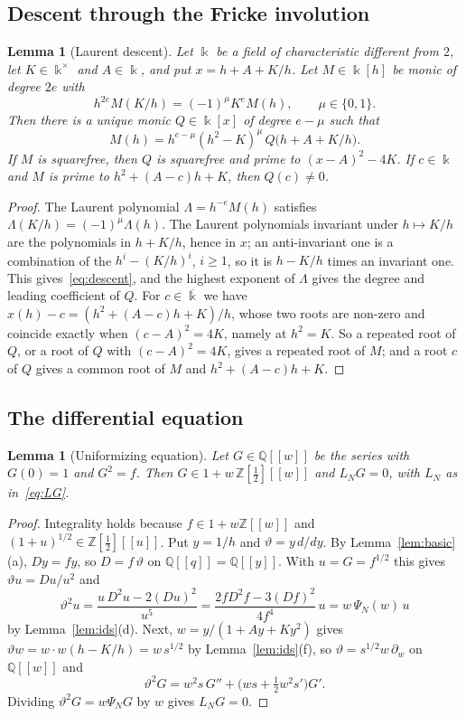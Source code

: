 \documentclass[11pt,a4paper]{article}
\newtheorem{lemma}[theorem]{Lemma}
\theoremstyle{definition}
\theoremstyle{remark}
\newcommand{\Z}{\mathbb{Z}}
\newcommand{\Q}{\mathbb{Q}}
\newcommand{\dw}{\partial_w}
\numberwithin{equation}{section}
\begin{document}
\subsection{Descent through the Fricke involution}

\begin{lemma}[Laurent descent]\label{lem:laurent}
Let $\Bbbk$ be a field of characteristic different from $2$, let
$K\in\Bbbk^\times$ and $A\in\Bbbk$, and put $x=h+A+K/h$. Let $M\in\Bbbk[h]$ be
monic of degree $2e$ with
\[
h^{2e}M(K/h)=(-1)^\mu K^eM(h),\qquad\mu\in\{0,1\}.
\]
Then there is a unique monic $Q\in\Bbbk[x]$ of degree $e-\mu$ such that
\begin{equation}\label{eq:descent}
 M(h)=h^{e-\mu}(h^2-K)^\mu\,Q\bigl(h+A+K/h\bigr).
\end{equation}
If $M$ is squarefree, then $Q$ is squarefree and prime to $(x-A)^2-4K$. If
$c\in\Bbbk$ and $M$ is prime to $h^2+(A-c)h+K$, then $Q(c)\ne0$.
\end{lemma}
\begin{proof}
The Laurent polynomial $\Lambda=h^{-e}M(h)$ satisfies
$\Lambda(K/h)=(-1)^\mu\Lambda(h)$. The Laurent polynomials invariant under
$h\mapsto K/h$ are the polynomials in $h+K/h$, hence in $x$; an anti-invariant
one is a combination of the $h^i-(K/h)^i$, $i\ge1$, so it is $h-K/h$ times an
invariant one. This gives~\eqref{eq:descent}, and the highest exponent of
$\Lambda$ gives the degree and leading coefficient of $Q$. For
$c\in\overline{\Bbbk}$ we have $x(h)-c=(h^2+(A-c)h+K)/h$, whose two roots
are non-zero and coincide exactly when $(c-A)^2=4K$, namely at $h^2=K$. So a
repeated root of $Q$, or a root of $Q$ with $(c-A)^2=4K$, gives a repeated
root of $M$; and a root $c$ of $Q$ gives a common root of $M$ and
$h^2+(A-c)h+K$.
\end{proof}

\subsection{The differential equation}

\begin{lemma}[Uniformizing equation]\label{lem:unif}
Let $G\in\Q[[w]]$ be the series with $G(0)=1$ and $G^2=f$. Then
$G\in1+w\,\Z[\tfrac12][[w]]$ and $L_NG=0$, with $L_N$ as in~\eqref{eq:LG}.
\end{lemma}
\begin{proof}
Integrality holds because $f\in1+w\Z[[w]]$ and
$(1+u)^{1/2}\in\Z[\frac12][[u]]$. Put $y=1/h$ and $\vartheta=y\,d/dy$. By
Lemma~\ref{lem:basic}(a), $Dy=fy$, so $D=f\,\vartheta$ on $\Q[[q]]=\Q[[y]]$.
With $u=G=f^{1/2}$ this gives $\vartheta u=Du/u^2$ and
\[
\vartheta^2u=\frac{u\,D^2u-2(Du)^2}{u^5}
=\frac{2fD^2f-3(Df)^2}{4f^4}\,u=w\,\Psi_N(w)\,u
\]
by Lemma~\ref{lem:ids}(d). Next, $w=y/(1+Ay+Ky^2)$ gives
$\vartheta w=w\cdot w(h-K/h)=w\,s^{1/2}$ by Lemma~\ref{lem:ids}(f), so
$\vartheta=s^{1/2}w\,\dw$ on $\Q[[w]]$ and
\[
\vartheta^2G=w^2s\,G''+\bigl(ws+\tfrac12w^2s'\bigr)G'.
\]
Dividing $\vartheta^2G=w\Psi_NG$ by $w$ gives $L_NG=0$.
\end{proof}
\end{document}
